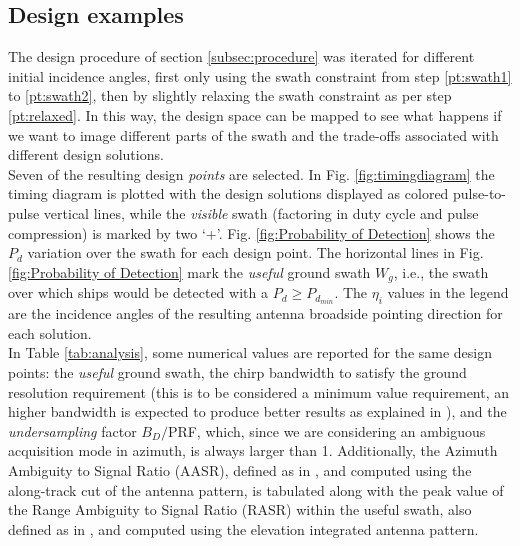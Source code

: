 \documentclass[conference,a4paper]{IEEEtran}
\begin{document}
    \subsection{Design examples}
    \label{subsec:analysis}
    The design procedure of section \ref{subsec:procedure} was iterated for different initial incidence angles, first only using the swath constraint from step \ref{pt:swath1} to \ref{pt:swath2}, then by slightly relaxing the swath constraint as per step \ref{pt:relaxed}.
    In this way, the design space can be mapped to see what happens if we want to image different parts of the swath and the trade-offs associated with different design solutions.\\
    Seven of the resulting design \emph{points} are selected.
    In Fig. \ref{fig:timingdiagram} the timing diagram is plotted with the design solutions displayed as colored pulse-to-pulse vertical lines, while the \emph{visible} swath (factoring in duty cycle and pulse compression) is marked by two `+'.
    Fig. \ref{fig:Probability of Detection} shows the $P_d$ variation over the swath for each design point.
    The horizontal lines in Fig. \ref{fig:Probability of Detection} mark the \emph{useful} ground swath $W_g$, i.e., the swath over which ships would be detected with a $P_d \geq P_{d_{min}}$.
    The $\eta_i$ values in the legend are the incidence angles of the resulting antenna broadside pointing direction for each solution.\\
    In Table \ref{tab:analysis}, some numerical values are reported for the same design points: the \emph{useful} ground swath, the chirp bandwidth to satisfy the ground resolution requirement (this is to be considered a minimum value requirement, an higher bandwidth is expected to produce better results as explained in \cite{DLRjournal}), and the \emph{undersampling} factor $B_D/$PRF, which, since we are considering an ambiguous acquisition mode in azimuth, is always larger than 1.
    Additionally, the Azimuth Ambiguity to Signal Ratio (AASR), defined as in \cite{curlander1991synthetic}, and computed using the along-track cut of the antenna pattern, is tabulated along with the peak value of the Range Ambiguity to Signal Ratio (RASR) within the useful swath, also defined as in \cite{curlander1991synthetic}, and computed using the elevation integrated antenna pattern.
\end{document}
